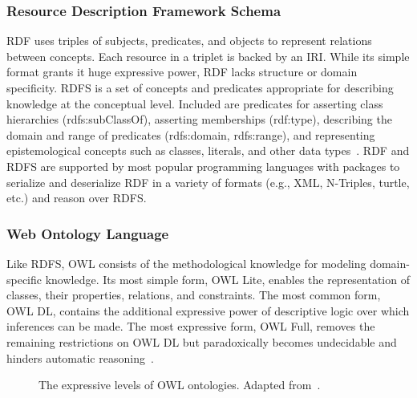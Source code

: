 \subsubsection{Resource Description Framework Schema}

\ac{RDF} uses triples of subjects, predicates, and objects to represent relations between concepts.
Each resource in a triplet is backed by an \ac{IRI}.
While its simple format grants it huge expressive power, \ac{RDF} lacks structure or domain specificity.
\ac{RDFS} is a set of concepts and predicates appropriate for describing knowledge at the conceptual level.
Included are predicates for asserting class hierarchies (rdfs:subClassOf), asserting memberships (rdf:type), describing the domain and range of predicates (rdfs:domain, rdfs:range), and representing epistemological concepts such as classes, literals, and other data types~\cite{Beckett2014}.
RDF and RDFS are supported by most popular programming languages with packages to serialize and deserialize RDF in a variety of formats (e.g., \ac{XML}, N-Triples, turtle, etc.) and reason over \ac{RDFS}.

\subsubsection{Web Ontology Language}

Like \ac{RDFS}, \ac{OWL} consists of the methodological knowledge for modeling domain-specific knowledge.
Its most simple form, \ac{OWL} Lite, enables the representation of classes, their properties, relations, and constraints.
The most common form, \ac{OWL} \ac{DL}, contains the additional expressive power of descriptive logic over which inferences can be made.
The most expressive form, \ac{OWL} Full, removes the remaining restrictions on \ac{OWL} \ac{DL} but paradoxically becomes undecidable and hinders automatic reasoning~\cite{Marchetti2008}.

\begin{figure}
    \captionsetup{format=plain}
    \caption[Descriptive Levels of OWL]{The expressive levels of OWL ontologies. Adapted from~\cite{Marchetti2008}.}
    \label{Fig:owl_types}
\end{figure}


